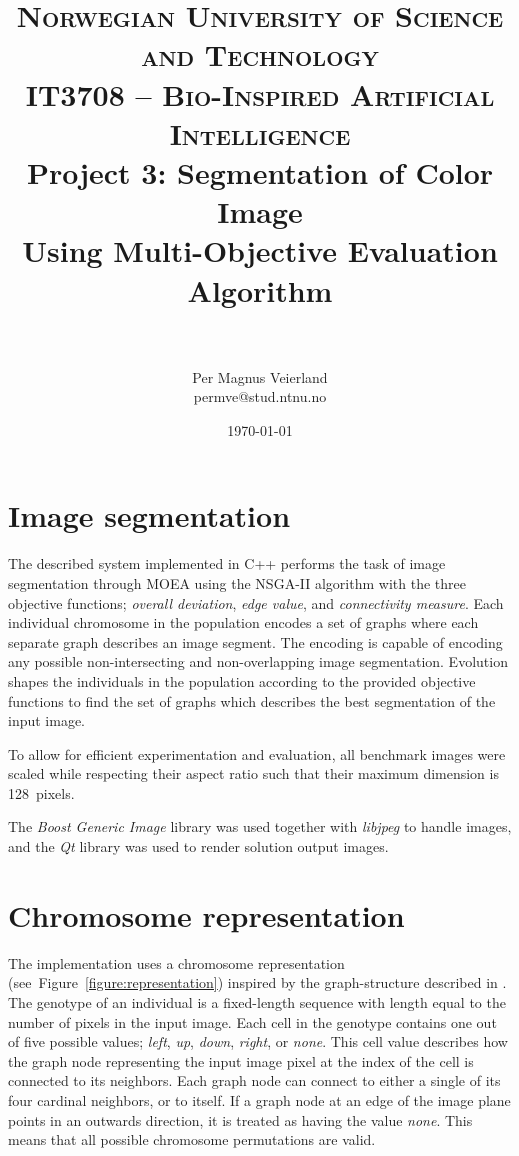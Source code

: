 \documentclass[paper=a4, fontsize=9pt]{scrartcl}
\title{
\vspace{-1cm}
\normalfont \normalsize
\textsc{Norwegian University of Science and Technology\\IT3708 -- Bio-Inspired Artificial Intelligence}
\horrule{0.5pt} \\[0cm]
\Huge Project 3: Segmentation of Color Image\\Using Multi-Objective Evaluation Algorithm\\[-0.3cm]
\horrule{2pt} \\[0.1cm]
}
\author{Per Magnus Veierland\\permve@stud.ntnu.no}
\date{\normalsize\today}
\begin{document}
\maketitle

\setlength\columnsep{20pt}

\begin{multicols}{2}


\section*{Image segmentation}


The described system implemented in C++ performs the task of image segmentation through \ac{MOEA} using the NSGA-II algorithm \cite{deb2002fast} with the three objective functions; \textit{overall deviation}, \textit{edge value}, and \textit{connectivity measure}. Each individual chromosome in the population encodes a set of graphs where each separate graph describes an image segment. The encoding is capable of encoding any possible non-intersecting and non-overlapping image segmentation. Evolution shapes the individuals in the population according to the provided objective functions to find the set of graphs which describes the best segmentation of the input image.

To allow for efficient experimentation and evaluation, all benchmark images were scaled while respecting their aspect ratio such that their maximum dimension is 128~pixels.

The \textit{Boost Generic Image} library was used together with \textit{libjpeg} to handle images, and the \textit{Qt} library was used to render solution output images.

\section*{Chromosome representation}

The implementation uses a chromosome representation (see~Figure~\ref{figure:representation}) inspired by the graph-structure described in \cite{shirakawa2009evolutionary}. The genotype of an individual is a fixed-length sequence with length equal to the number of pixels in the input image. Each cell in the genotype contains one out of five possible values; \textit{left}, \textit{up}, \textit{down}, \textit{right}, or \textit{none}. This cell value describes how the graph node representing the input image pixel at the index of the cell is connected to its neighbors. Each graph node can connect to either a single of its four cardinal neighbors, or to itself. If a graph node at an edge of the image plane points in an outwards direction, it is treated as having the value \textit{none}. This means that all possible chromosome permutations are valid.


\end{multicols}
\end{document}
